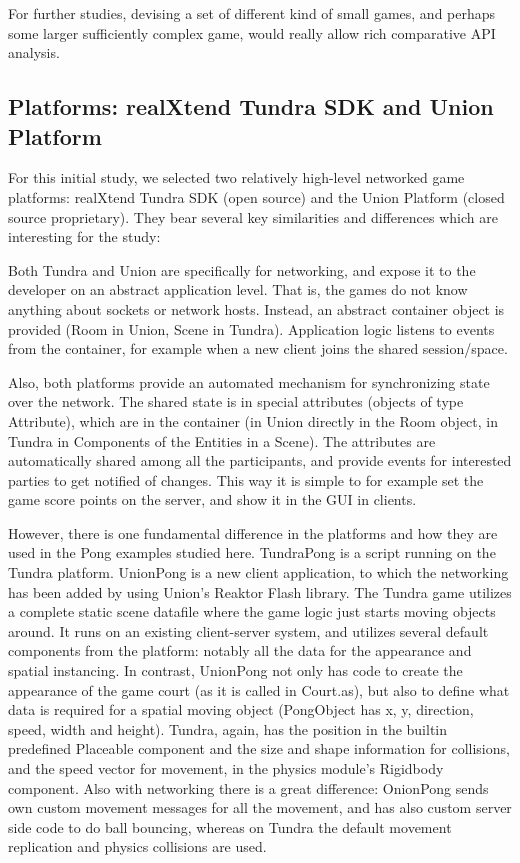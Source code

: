 \documentclass[conference]{IEEEtran}
\begin{document}
For further studies, devising a set of different kind of small games,
and perhaps some larger sufficiently complex game, would really allow
rich comparative API analysis.


\subsection{Platforms: realXtend Tundra SDK and Union Platform%
  \label{platforms-realxtend-tundra-sdk-and-union-platform}%
}

For this initial study, we selected two relatively high-level
networked game platforms: realXtend Tundra SDK (open source) and the
Union Platform (closed source proprietary). They bear several key
similarities and differences which are interesting for the study:

Both Tundra and Union are specifically for networking, and expose it
to the developer on an abstract application level. That is, the games
do not know anything about sockets or network hosts. Instead, an
abstract container object is provided (Room in Union, Scene in
Tundra). Application logic listens to events from the container, for
example when a new client joins the shared session/space.

Also, both platforms provide an automated mechanism for synchronizing
state over the network. The shared state is in special attributes
(objects of type Attribute), which are in the container (in Union
directly in the Room object, in Tundra in Components of the Entities in a Scene). The
attributes are automatically shared among all the participants, and
provide events for interested parties to get notified of changes. This
way it is simple to for example set the game score points on the
server, and show it in the GUI in clients.

However, there is one fundamental difference in the platforms and how
they are used in the Pong examples studied here. TundraPong is a
script running on the Tundra platform. UnionPong is a new client
application, to which the networking has been added by using Union's
Reaktor Flash library. The Tundra game utilizes a complete static
scene datafile where the game logic just starts moving objects
around. It runs on an existing client-server system, and utilizes
several default components from the platform: notably all the data for
the appearance and spatial instancing. In contrast, UnionPong not only
has code to create the appearance of the game court (as it is called
in Court.as), but also to define what data is required for a spatial
moving object (PongObject has x, y, direction, speed, width and
height). Tundra, again, has the position in the builtin predefined
Placeable component and the size and shape information for collisions,
and the speed vector for movement, in the physics module's Rigidbody
component. Also with networking there is a great difference: OnionPong
sends own custom movement messages for all the movement, and has also
custom server side code to do ball bouncing, whereas on Tundra the
default movement replication and physics collisions are used.
\end{document}
